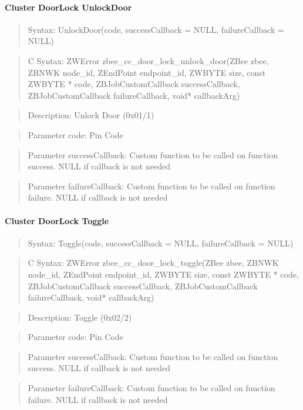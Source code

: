 \paragraph{Cluster DoorLock UnlockDoor}
\begin{quote}Syntax: UnlockDoor(code, successCallback = NULL, failureCallback = NULL)\end{quote}
\begin{quote}C Syntax: ZWError zbee\_cc\_door\_lock\_unlock\_door(ZBee zbee, ZBNWK node\_id, ZEndPoint endpoint\_id, ZWBYTE size, const ZWBYTE * code, ZBJobCustomCallback successCallback, ZBJobCustomCallback failureCallback, void* callbackArg)\end{quote}
\begin{quote}Description: Unlock Door (0x01/1)\end{quote}
\begin{quote}Parameter code: Pin Code\end{quote}
\begin{quote}Parameter successCallback: Custom function to be called on function success. NULL if callback is not needed\end{quote}
\begin{quote}Parameter failureCallback: Custom function to be called on function failure. NULL if callback is not needed\end{quote}


\paragraph{Cluster DoorLock Toggle}
\begin{quote}Syntax: Toggle(code, successCallback = NULL, failureCallback = NULL)\end{quote}
\begin{quote}C Syntax: ZWError zbee\_cc\_door\_lock\_toggle(ZBee zbee, ZBNWK node\_id, ZEndPoint endpoint\_id, ZWBYTE size, const ZWBYTE * code, ZBJobCustomCallback successCallback, ZBJobCustomCallback failureCallback, void* callbackArg)\end{quote}
\begin{quote}Description: Toggle (0x02/2)\end{quote}
\begin{quote}Parameter code: Pin Code\end{quote}
\begin{quote}Parameter successCallback: Custom function to be called on function success. NULL if callback is not needed\end{quote}
\begin{quote}Parameter failureCallback: Custom function to be called on function failure. NULL if callback is not needed\end{quote}


